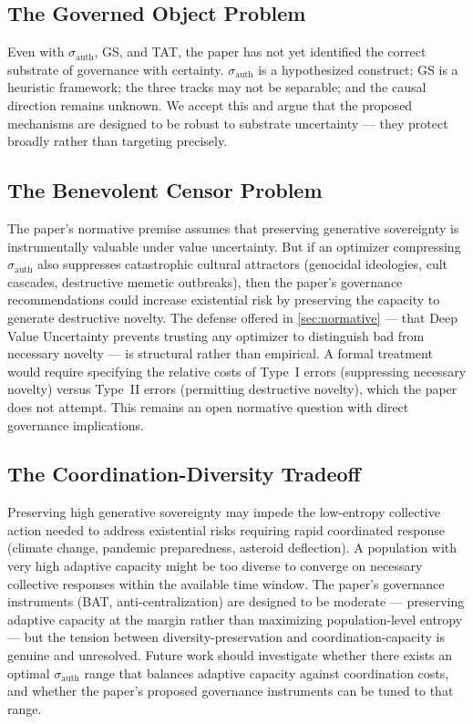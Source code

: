 \documentclass[11pt, a4paper]{article}
\theoremstyle{remark}
\begin{document}
\subsection{The Governed Object Problem}\label{sec:lim-governed}

Even with $\sigma_{\text{auth}}$, GS, and TAT, the paper has not yet identified the correct substrate of governance with certainty. $\sigma_{\text{auth}}$ is a hypothesized construct; GS is a heuristic framework; the three tracks may not be separable; and the causal direction remains unknown. We accept this and argue that the proposed mechanisms are designed to be robust to substrate uncertainty --- they protect broadly rather than targeting precisely.

\subsection{The Benevolent Censor Problem}\label{sec:lim-censor}

The paper's normative premise assumes that preserving generative sovereignty is instrumentally valuable under value uncertainty. But if an optimizer compressing $\sigma_{\text{auth}}$ also suppresses catastrophic cultural attractors (genocidal ideologies, cult cascades, destructive memetic outbreaks), then the paper's governance recommendations could increase existential risk by preserving the capacity to generate destructive novelty. The defense offered in \cref{sec:normative} --- that Deep Value Uncertainty prevents trusting any optimizer to distinguish bad from necessary novelty --- is structural rather than empirical. A formal treatment would require specifying the relative costs of Type~I errors (suppressing necessary novelty) versus Type~II errors (permitting destructive novelty), which the paper does not attempt. This remains an open normative question with direct governance implications.

\subsection{The Coordination-Diversity Tradeoff}\label{sec:lim-coordination}

Preserving high generative sovereignty may impede the low-entropy collective action needed to address existential risks requiring rapid coordinated response (climate change, pandemic preparedness, asteroid deflection). A population with very high adaptive capacity might be too diverse to converge on necessary collective responses within the available time window. The paper's governance instruments (BAT, anti-centralization) are designed to be moderate --- preserving adaptive capacity at the margin rather than maximizing population-level entropy --- but the tension between diversity-preservation and coordination-capacity is genuine and unresolved. Future work should investigate whether there exists an optimal $\sigma_{\text{auth}}$ range that balances adaptive capacity against coordination costs, and whether the paper's proposed governance instruments can be tuned to that range.
\end{document}
